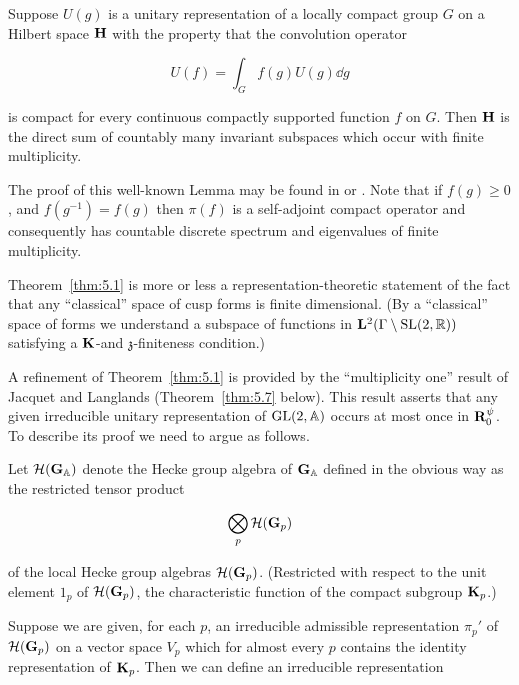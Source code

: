 \begin{lemma}\label{lem:5.3}

Suppose $U(g)$ is a unitary representation of a locally compact group $G$ on a Hilbert space $\mathbf{H}$ with the property that the convolution operator

\[
U(f) = \int_G f(g) U(g) \dd g
\]

is compact for every continuous compactly supported function $f$ on $G$. Then $\mathbf{H}$ is the direct sum of countably many invariant subspaces which occur with finite multiplicity.

\end{lemma}

The proof of this well-known Lemma may be found in \cite{GelfandGraevPyatetskiiShapiro} or \cite{Langlands}. Note that if $f(g) \geq 0$, and $f(g^{-1}) = f(g)$ then $\pi(f)$ is a self-adjoint compact operator and consequently has countable discrete spectrum and eigenvalues of finite multiplicity.

\begin{remark}\label{rem:5.4}

Theorem~\ref{thm:5.1} is more or less a representation-theoretic statement of the fact that any ``classical'' space of cusp forms is finite dimensional. (By a ``classical'' space of forms we understand a subspace of functions in $\mathbf{L}^2(\Gamma \setminus \operatorname{SL}(2,\mathbb{R}))$ satisfying a $\mathbf{K}$-and $\mathfrak{z}$-finiteness condition.)

\end{remark}

A refinement of Theorem~\ref{thm:5.1} is provided by the ``multiplicity one'' result of Jacquet and Langlands (Theorem~\ref{thm:5.7} below). This result asserts that any given irreducible unitary representation of $\operatorname{GL}(2,\mathbb{A})$ occurs at most once in $\mathbf{R}_0^{\psi}$. To describe its proof we need to argue as follows.

Let $\mathcal{H}(\mathbf{G}_{\mathbb{A}})$ denote the Hecke group algebra of $\mathbf{G}_{\mathbb{A}}$ defined in the obvious way as the restricted tensor product

\[
\bigotimes_p \mathcal{H}(\mathbf{G}_p)
\]

of the local Hecke group algebras $\mathcal{H}(\mathbf{G}_p)$. (Restricted with respect to the unit element $1_p$ of $\mathcal{H}(\mathbf{G}_p)$, the characteristic function of the compact subgroup $\mathbf{K}_p$.)

Suppose we are given, for each $p$, an irreducible admissible representation $\pi_p'$ of $\mathcal{H}(\mathbf{G}_p)$ on a vector space $V_p$ which for almost every $p$ contains the identity representation of $\mathbf{K}_p$. Then we can define an irreducible representation

